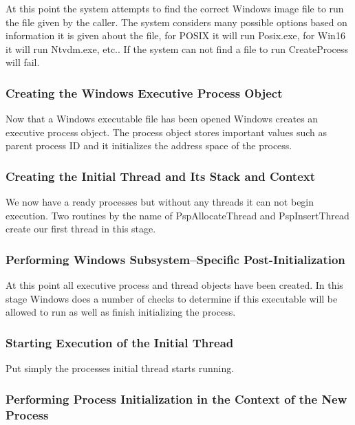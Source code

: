 \documentclass[letterpaper, 10pt, onecolumn, draftclsnofoot]{IEEEtran}
\begin{document}
At this point the system attempts to find the correct Windows image file to run the file given by the caller. The system considers many possible options based on information it is given about the file, for POSIX it will run Posix.exe, for Win16 it will run Ntvdm.exe, etc.. If the system can not find a file to run CreateProcess will fail.\cite{wi_p1}

\subsubsection{Creating the Windows Executive Process Object}

Now that a Windows executable file has been opened Windows creates an executive process object. The process object stores important values such as parent process ID and it initializes the address space of the process.\cite{wi_p1}

\subsubsection{Creating the Initial Thread and Its Stack and Context}

We now have a ready processes but without any threads it can not begin execution. Two routines by the name of PspAllocateThread and PspInsertThread create our first thread in this stage.\cite{wi_p1}

\subsubsection{Performing Windows Subsystem–Specific Post-Initialization}

At this point all executive process and thread objects have been created.  
In this stage Windows does a number of checks to determine if this executable will be allowed to run as well as finish initializing the process.\cite{wi_p1} 

\subsubsection{Starting Execution of the Initial Thread}

Put simply the processes initial thread starts running. \cite{wi_p1} 

\subsubsection{Performing Process Initialization in the Context of the
New Process}
\end{document}
